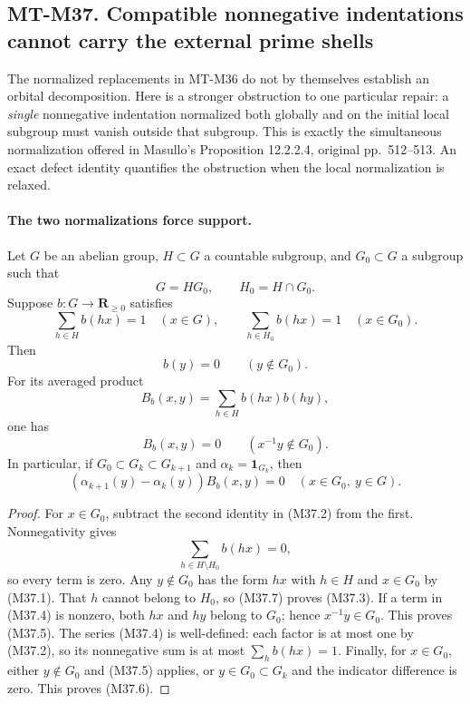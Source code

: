 \subsection*{MT-M37. Compatible nonnegative indentations cannot carry
the external prime shells}

The normalized replacements in MT-M36 do not by themselves
establish an orbital decomposition.  Here is a stronger
obstruction to one particular repair: a \emph{single}
nonnegative indentation normalized both globally and on
the initial local subgroup must vanish outside that subgroup.
This is exactly the simultaneous normalization offered in
Masullo's Proposition 12.2.2.4, original pp.~512--513.
An exact defect identity quantifies the obstruction
when the local normalization is relaxed.

\paragraph{The two normalizations force support.}
Let $G$ be an abelian group, $H\subset G$ a countable
subgroup, and $G_0\subset G$ a subgroup such that
\[
                 G=HG_0,\qquad H_0=H\cap G_0.
 \tag{M37.1}
\]
Suppose $b:G\to\mathbf R_{\ge0}$ satisfies
\[
 \sum_{h\in H}b(hx)=1\quad(x\in G),\qquad
 \sum_{h\in H_0}b(hx)=1\quad(x\in G_0).
 \tag{M37.2}
\]
Then
\[
                       b(y)=0\qquad(y\notin G_0).
 \tag{M37.3}
\]
For its averaged product
\[
                     B_b(x,y)=\sum_{h\in H}b(hx)b(hy),
 \tag{M37.4}
\]
one has
\[
                  B_b(x,y)=0\qquad(x^{-1}y\notin G_0).
 \tag{M37.5}
\]
In particular, if $G_0\subset G_k\subset G_{k+1}$ and
$\alpha_k=\mathbf1_{G_k}$, then
\[
       (\alpha_{k+1}(y)-\alpha_k(y))B_b(x,y)=0
                                      \quad(x\in G_0,\ y\in G).
 \tag{M37.6}
\]

\begin{proof}
For $x\in G_0$, subtract the second identity in (M37.2)
from the first.  Nonnegativity gives
\[
                       \sum_{h\in H\setminus H_0}b(hx)=0,
 \tag{M37.7}
\]
so every term is zero.  Any $y\notin G_0$ has the form
$hx$ with $h\in H$ and $x\in G_0$ by (M37.1).
That $h$ cannot belong to $H_0$, so (M37.7) proves
(M37.3).  If a term in (M37.4) is nonzero, both
$hx$ and $hy$ belong to $G_0$; hence $x^{-1}y\in G_0$.
This proves (M37.5).  The series (M37.4) is well-defined:
each factor is at most one by (M37.2), so its nonnegative
sum is at most $\sum_hb(hx)=1$.
Finally, for $x\in G_0$, either $y\notin G_0$ and
(M37.5) applies, or $y\in G_0\subset G_k$ and the
indicator difference is zero.  This proves (M37.6).
\end{proof}

